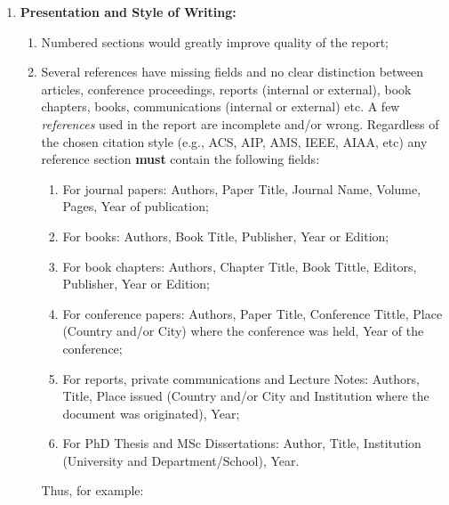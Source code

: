 \documentclass[14pt,twoside]{report}
\begin{document}
\begin{enumerate}
%
    \item {\bf Presentation and Style of Writing:}
                \begin{enumerate}
                   \item Numbered sections would greatly improve quality of the report;
                   \item Several references have missing fields and no clear distinction between articles, conference proceedings, reports (internal or external), book chapters, books, communications (internal or external) etc.  A few {\it references} used in the report are incomplete and/or wrong. Regardless of the chosen citation style (e.g., ACS, AIP, AMS, IEEE, AIAA, etc) any reference section {\bf must} contain the following fields: 
                      \begin{enumerate}
                         \item For journal papers: Authors, Paper Title, Journal Name, Volume, Pages, Year of publication;
                         \item For books: Authors, Book Title, Publisher, Year or Edition;
                         \item For book chapters: Authors, Chapter Title, Book Tittle, Editors, Publisher, Year or Edition;
                         \item For conference papers: Authors, Paper Title, Conference Tittle, Place (Country and/or City) where the conference was held, Year of the conference;
                         \item For reports, private communications and Lecture Notes: Authors, Title, Place issued (Country and/or City and Institution where the document was originated), Year;
                         \item For PhD Thesis and MSc Dissertations: Author, Title, Institution (University and Department/School), Year.
                      \end{enumerate}  
                      Thus, for example:
\end{enumerate}
\end{enumerate}
\end{document}
